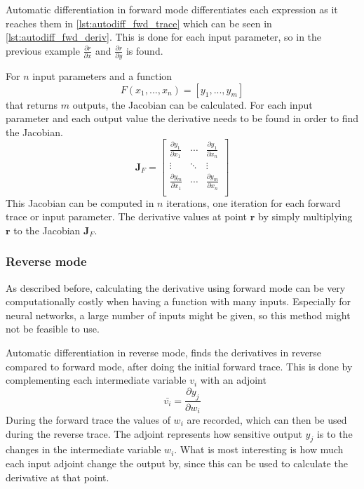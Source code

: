 Automatic differentiation in forward mode differentiates each expression as it reaches them in \autoref{lst:autodiff_fwd_trace} which can be seen in \autoref{lst:autodiff_fwd_deriv}. This is done for each input parameter, so in the previous example $\frac{\partial r}{\partial x}$ and $\frac{\partial r}{\partial y}$ is found.

For $n$ input parameters and a function $$F(x_1, ..., x_n) = [ y_1, ..., y_m ]$$ that returns $m$ outputs, the Jacobian can be calculated. For each input parameter and each output value the derivative needs to be found in order to find the Jacobian.
$$\bm{J}_F = \left[
  \begin{array}{ccc}
    \frac{\partial y_1}{\partial x_1} & \cdots & \frac{\partial y_1}{\partial x_n}\\
    \vdots & \ddots & \vdots\\
    \frac{\partial y_m}{\partial x_1} & \cdots & \frac{\partial y_m}{\partial x_n}\\
  \end{array}
\right]$$
This Jacobian can be computed in $n$ iterations, one iteration for each forward trace or input parameter.
The derivative values at point $\bm{r}$ by simply multiplying $\bm{r}$ to the Jacobian $\bm{J}_F$.

\subsubsection{Reverse mode}%
\label{ssub:reverse_mode}

As described before, calculating the derivative using forward mode can be very computationally costly when having a function with many inputs.
Especially for neural networks, a large number of inputs might be given, so this method might not be feasible to use.

Automatic differentiation in reverse mode, finds the derivatives in reverse compared to forward mode, after doing the initial forward trace.
This is done by complementing each intermediate variable $v_i$ with an adjoint \cite{autodiff}
\begin{equation}\label{eqn:autodiff_adjoint}
\bar{v_i} = \frac{\partial y_j}{\partial w_i}
\end{equation}
During the forward trace the values of $w_i$ are recorded, which can then be used during the reverse trace.
The adjoint represents how sensitive output $y_j$ is to the changes in the intermediate variable $w_i$.
What is most interesting is how much each input adjoint change the output by, since this can be used to calculate the derivative at that point.

